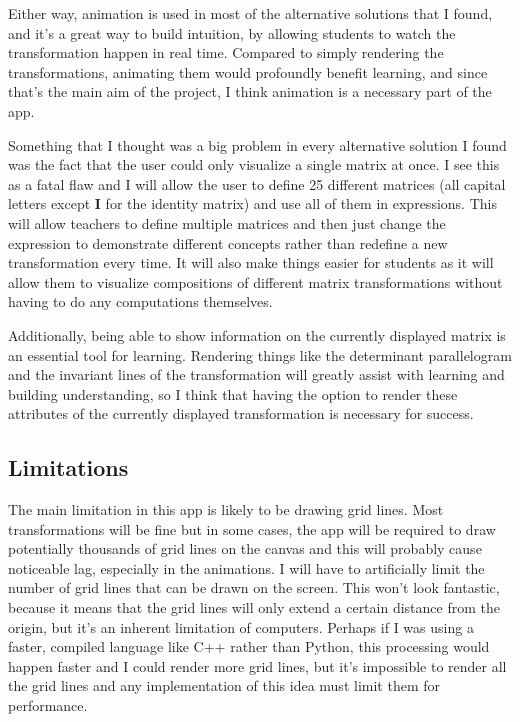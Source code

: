 \documentclass[../main.tex]{subfiles}
\begin{document}
Either way, animation is used in most of the alternative solutions that I found, and it's a great way to build intuition, by allowing students to watch the transformation happen in real time. Compared to simply rendering the transformations, animating them would profoundly benefit learning, and since that's the main aim of the project, I think animation is a necessary part of the app.

Something that I thought was a big problem in every alternative solution I found was the fact that the user could only visualize a single matrix at once. I see this as a fatal flaw and I will allow the user to define 25 different matrices (all capital letters except $\mathbf{I}$ for the identity matrix) and use all of them in expressions. This will allow teachers to define multiple matrices and then just change the expression to demonstrate different concepts rather than redefine a new transformation every time. It will also make things easier for students as it will allow them to visualize compositions of different matrix transformations without having to do any computations themselves.

Additionally, being able to show information on the currently displayed matrix is an essential tool for learning. Rendering things like the determinant parallelogram and the invariant lines of the transformation will greatly assist with learning and building understanding, so I think that having the option to render these attributes of the currently displayed transformation is necessary for success.

\subsection{Limitations\label{analysis:limitations}}

The main limitation in this app is likely to be drawing grid lines. Most transformations will be fine but in some cases, the app will be required to draw potentially thousands of grid lines on the canvas and this will probably cause noticeable lag, especially in the animations. I will have to artificially limit the number of grid lines that can be drawn on the screen. This won't look fantastic, because it means that the grid lines will only extend a certain distance from the origin, but it's an inherent limitation of computers. Perhaps if I was using a faster, compiled language like C++ rather than Python, this processing would happen faster and I could render more grid lines, but it's impossible to render all the grid lines and any implementation of this idea must limit them for performance.
\end{document}

